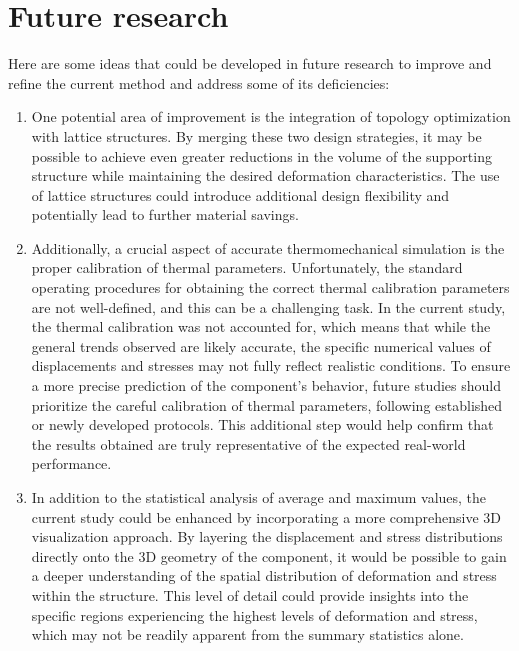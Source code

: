 \documentclass[../main.tex]{subfiles}
\begin{document}
\begin{enumerate}
\end{enumerate}

\section{Future research}

Here are some ideas that could be developed in future research to improve and refine the current method and address some of its deficiencies:

\begin{enumerate}

  \item One potential area of improvement is the integration of topology optimization with lattice structures. By merging these two design strategies, it may be possible to achieve even greater reductions in the volume of the supporting structure while maintaining the desired deformation characteristics. The use of lattice structures could introduce additional design flexibility and potentially lead to further material savings.

  \item Additionally, a crucial aspect of accurate thermomechanical simulation is the proper calibration of thermal parameters. Unfortunately, the standard operating procedures for obtaining the correct thermal calibration parameters are not well-defined, and this can be a challenging task. In the current study, the thermal calibration was not accounted for, which means that while the general trends observed are likely accurate, the specific numerical values of displacements and stresses may not fully reflect realistic conditions. To ensure a more precise prediction of the component's behavior, future studies should prioritize the careful calibration of thermal parameters, following established or newly developed protocols. This additional step would help confirm that the results obtained are truly representative of the expected real-world performance.

  \item In addition to the statistical analysis of average and maximum values, the current study could be enhanced by incorporating a more comprehensive 3D visualization approach. By layering the displacement and stress distributions directly onto the 3D geometry of the component, it would be possible to gain a deeper understanding of the spatial distribution of deformation and stress within the structure. This level of detail could provide insights into the specific regions experiencing the highest levels of deformation and stress, which may not be readily apparent from the summary statistics alone.


\end{enumerate}
\end{document}
